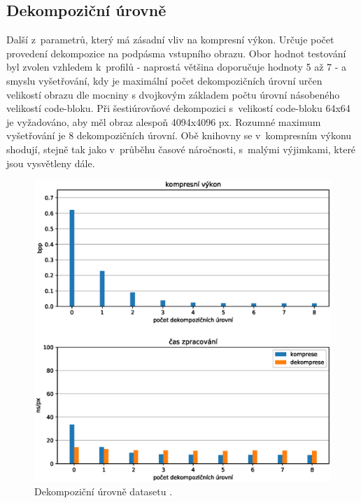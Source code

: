 
%
%
\newpage
\subsection*{Dekompoziční úrovně}
Další z~parametrů, který má zásadní vliv na kompresní výkon. Určuje počet provedení dekompozice na podpásma vstupního obrazu. Obor hodnot testování byl zvolen vzhledem k~profilů - naprostá většina doporučuje hodnoty 5 až 7 - a smyslu vyšetřování, kdy je maximální počet dekompozičních úrovní určen velikostí obrazu dle mocniny s dvojkovým základem počtu úrovní násobeného velikostí code-bloku. Při šestiúrovňové dekompozici s~velikostí code-bloku 64x64 je vyžadováno, aby měl obraz alespoň 4094x4096 px. Rozumné maximum vyšetřování je 8 dekompozičních úrovní. Obě knihovny se v~kompresním výkonu shodují, stejně tak jako v~průběhu časové náročnosti, s~malými výjimkami, které jsou vysvětleny dále.

\begin{figure}[hbt!]
  \centering
  \hspace*{-0.75cm}
  \includegraphics[width=16cm]{obrazky-figures/levels/fotky_levels.eps}
  \caption{Dekompoziční úrovně datasetu .}
\end{figure}

